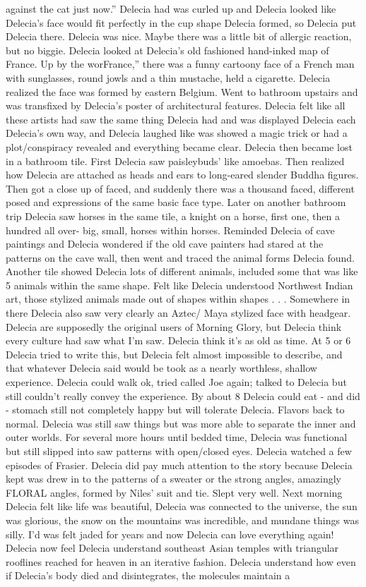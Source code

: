 \documentclass[12pt]{book}
\begin{document}
against the cat just now.'' Delecia had was curled up and Delecia looked like Delecia's face would fit perfectly in the cup shape Delecia formed, so Delecia put Delecia there. Delecia was nice. Maybe there was a little bit of allergic reaction, but no biggie. Delecia looked at Delecia's old fashioned hand-inked map of France. Up by the worFrance,'' there was a funny cartoony face of a French man with sunglasses, round jowls and a thin mustache, held a cigarette. Delecia realized the face was formed by eastern Belgium. Went to bathroom upstairs and was transfixed by Delecia's poster of architectural features. Delecia felt like all these artists had saw the same thing Delecia had and was displayed Delecia each Delecia's own way, and Delecia laughed like was showed a magic trick or had a plot/conspiracy revealed and everything became clear. Delecia then became lost in a bathroom tile. First Delecia saw paisleybuds' like amoebas. Then realized how Delecia are attached as heads and ears to long-eared slender Buddha figures. Then got a close up of faced, and suddenly there was a thousand faced, different posed and expressions of the same basic face type. Later on another bathroom trip Delecia saw horses in the same tile, a knight on a horse, first one, then a hundred all over- big, small, horses within horses. Reminded Delecia of cave paintings and Delecia wondered if the old cave painters had stared at the patterns on the cave wall, then went and traced the animal forms Delecia found. Another tile showed Delecia lots of different animals, included some that was like 5 animals within the same shape. Felt like Delecia understood Northwest Indian art, those stylized animals made out of shapes within shapes . . .  Somewhere in there Delecia also saw very clearly an Aztec/ Maya stylized face with headgear. Delecia are supposedly the original users of Morning Glory, but Delecia think every culture had saw what I'm saw. Delecia think it's as old as time. At 5 or 6 Delecia tried to write this, but Delecia felt almost impossible to describe, and that whatever Delecia said would be took as a nearly worthless, shallow experience. Delecia could walk ok, tried called Joe again; talked to Delecia but still couldn't really convey the experience. By about 8 Delecia could eat - and did - stomach still not completely happy but will tolerate Delecia. Flavors back to normal. Delecia was still saw things but was more able to separate the inner and outer worlds. For several more hours until bedded time, Delecia was functional but still slipped into saw patterns with open/closed eyes. Delecia watched a few episodes of Frasier. Delecia did pay much attention to the story because Delecia kept was drew in to the patterns of a sweater or the strong angles, amazingly FLORAL angles, formed by Niles' suit and tie. Slept very well. Next morning Delecia felt like life was beautiful, Delecia was connected to the universe, the sun was glorious, the snow on the mountains was incredible, and mundane things was silly. I'd was felt jaded for years and now Delecia can love everything again! Delecia now feel Delecia understand southeast Asian temples with triangular rooflines reached for heaven in an iterative fashion. Delecia understand how even if Delecia's body died and disintegrates, the molecules maintain a 
\end{document}

